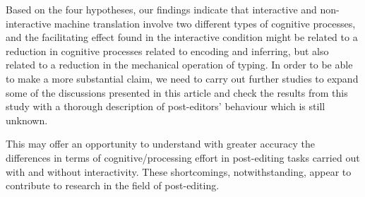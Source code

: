 \documentclass[output=paper]{langsci/langscibook}
\begin{document}
Based on the four hypotheses, our findings indicate that interactive and non-interactive machine translation involve two different types of cognitive processes, and the facilitating effect found in the interactive condition might be related to a reduction in cognitive processes related to encoding and inferring, but also related to a reduction in the mechanical operation of typing. In order to be able to make a more substantial claim, we need to carry out further studies to expand some of the discussions presented in this article and check the results from this study with a thorough description of post-editors' behaviour which is still unknown.  



This may offer an opportunity to understand with greater accuracy the differences in terms of cognitive/processing effort in post-editing tasks carried out with and without interactivity. These shortcomings, notwithstanding, appear to contribute to research in the field of post-editing.
\end{document}
